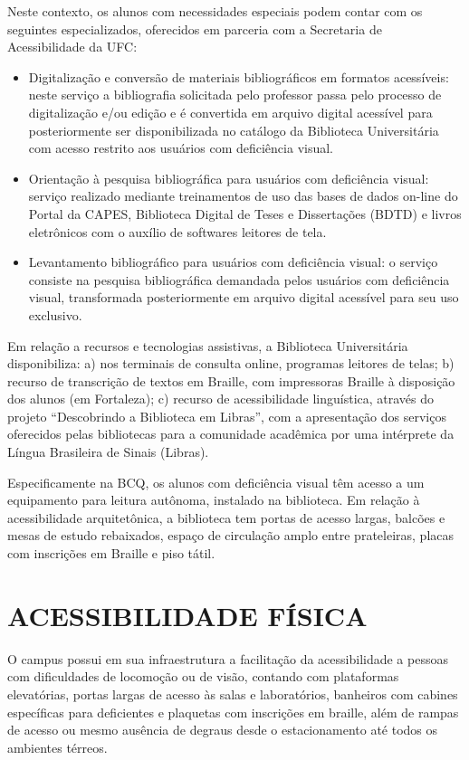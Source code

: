 Neste contexto, os alunos com necessidades especiais podem contar com os seguintes especializados, oferecidos em parceria com a Secretaria de Acessibilidade da UFC:
\begin{itemize}
    \item Digitalização e conversão de materiais bibliográficos em formatos acessíveis: neste serviço a bibliografia solicitada pelo professor passa pelo processo de digitalização e/ou edição e é convertida em arquivo digital acessível para posteriormente ser disponibilizada no catálogo da Biblioteca Universitária com acesso restrito aos usuários com deficiência visual.
    \item Orientação à pesquisa bibliográfica para usuários com deficiência visual: serviço realizado mediante treinamentos de uso das bases de dados on-line do Portal da CAPES, Biblioteca Digital de Teses e Dissertações (BDTD) e livros eletrônicos com o auxílio de softwares leitores de tela.
    \item Levantamento bibliográfico para usuários com deficiência visual: o serviço consiste na pesquisa bibliográfica demandada pelos usuários com deficiência visual, transformada posteriormente em arquivo digital acessível para seu uso exclusivo.
\end{itemize}

Em relação a recursos e tecnologias assistivas, a Biblioteca Universitária disponibiliza: a) nos terminais de consulta online, programas leitores de telas; b) recurso de transcrição de textos em Braille, com impressoras Braille à disposição dos alunos (em Fortaleza); c) recurso de acessibilidade linguística, através do projeto “Descobrindo a Biblioteca em Libras”, com a apresentação dos serviços oferecidos pelas bibliotecas para a comunidade acadêmica por uma intérprete da Língua Brasileira de Sinais (Libras).

Especificamente na BCQ, os alunos com deficiência visual têm acesso a um equipamento para leitura autônoma, instalado na biblioteca. Em relação à acessibilidade arquitetônica, a biblioteca tem portas de acesso largas, balcões e mesas de estudo rebaixados, espaço de circulação amplo entre prateleiras, placas com inscrições em Braille e piso tátil.

\section{ACESSIBILIDADE FÍSICA}

O campus possui em sua infraestrutura a facilitação da acessibilidade a pessoas com dificuldades de locomoção ou de visão, contando com plataformas elevatórias, portas largas de acesso às salas e laboratórios, banheiros com cabines específicas para deficientes e plaquetas com inscrições em braille, além de rampas de acesso ou mesmo ausência de degraus desde o estacionamento até todos os ambientes térreos.

